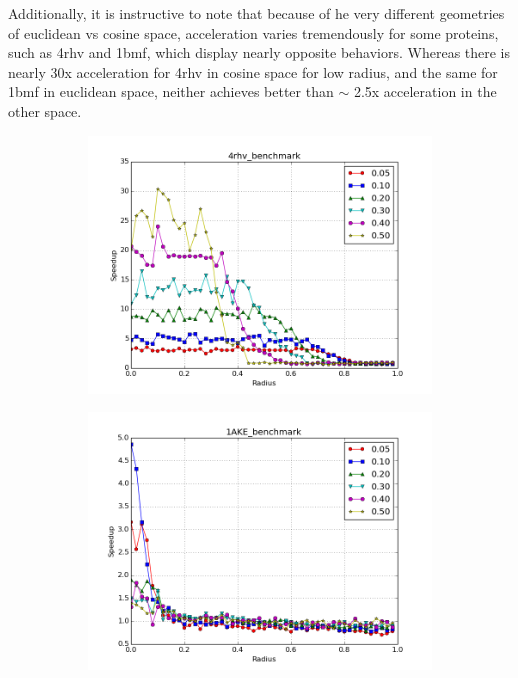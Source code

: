 \documentclass{amsbook}
\theoremstyle{definition}
\theoremstyle{remark}
\numberwithin{equation}{section}
\begin{document}
Additionally, it is instructive to note that because of he very different geometries of euclidean vs cosine space, acceleration varies tremendously for some proteins, such as 4rhv and 1bmf, which display nearly opposite behaviors.
Whereas there is nearly 30x acceleration for 4rhv in cosine space for low radius, and the same for 1bmf in euclidean space, neither achieves better than $\sim$ 2.5x acceleration in the other space.

\begin{figure}[tbp]
    \centering
    \begin{subfigure}[b]{0.49\textwidth}
        \includegraphics[width=1\textwidth]{assets/4rhv_benchmark_cosine}
        \caption{}
    \end{subfigure}%
    \begin{subfigure}[b]{0.49\textwidth}
        \includegraphics[width=1\textwidth]{assets/1AKE_benchmark_cosine}

\end{subfigure}
\end{figure}
\end{document}
